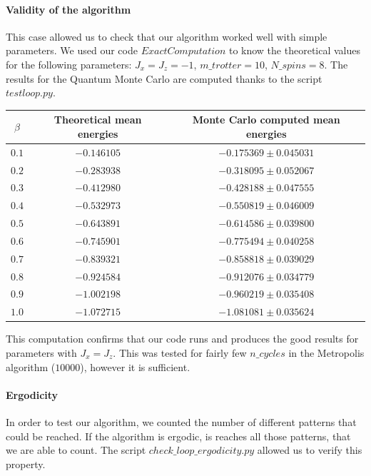 \documentclass[a4paper,12pt]{article}
\begin{document}
	\paragraph{Validity of the algorithm} This case allowed us to check that our algorithm worked well with simple parameters.
	We used our code $ExactComputation$ to know the theoretical values for the following parameters: $J_x = J_z = - 1$,  $m\_trotter = 10$,  $N\_spins = 8$. The results for the Quantum Monte Carlo are computed thanks to the script $testloop.py$. \\
		\begin{tabular}[c]{| c || c | c |}
			\hline
			$\beta$ & Theoretical mean energies & Monte Carlo computed mean energies \\ \hline
			$0.1$ & $-0.146105$ & $-0.175369 \pm 0.045031$ \\ \hline
			$0.2$ & $-0.283938$ & $-0.318095 \pm 0.052067$ \\ \hline
			$0.3$ & $-0.412980$ & $-0.428188 \pm 0.047555$ \\ \hline
			$0.4$ & $-0.532973$ & $-0.550819 \pm 0.046009$ \\ \hline
			$0.5$ & $-0.643891$ & $-0.614586 \pm 0.039800$ \\ \hline
			$0.6$ & $-0.745901$ & $-0.775494 \pm 0.040258$ \\ \hline
			$0.7$ & $-0.839321$ & $-0.858818 \pm 0.039029$ \\ \hline
			$0.8$ & $-0.924584$ & $-0.912076 \pm 0.034779$ \\ \hline
			$0.9$ & $-1.002198$ & $-0.960219 \pm 0.035408$ \\ \hline
			$1.0$ & $-1.072715$ & $-1.081081 \pm 0.035624$ \\ \hline
		\end{tabular} 
	\newline
	This computation confirms that our code runs and produces the good results for parameters with $J_x = J_z$. This was tested for fairly few $n\_cycles$ in the Metropolis algorithm ($10000$), however it is sufficient.
	
	\paragraph{Ergodicity} In order to test our algorithm, we counted the number of different patterns that could be reached. If the algorithm is ergodic, is reaches all those patterns, that we are able to count. The script $check\_loop\_ergodicity.py$ allowed us to verify this property. 
	
\end{document}
